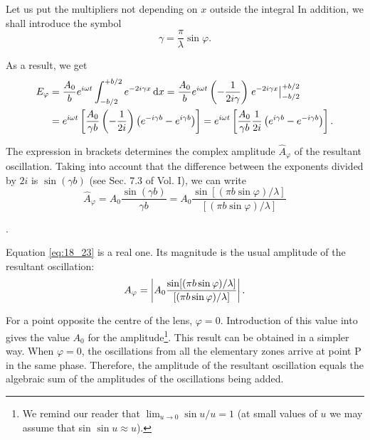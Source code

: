 \noindent
Let us put the multipliers not depending on $x$ outside the integral In addition, we shall introduce the symbol
\begin{equation}\label{eq:18_22}
	\gamma = \frac{\pi}{\lambda} \sin\varphi.
\end{equation}

\noindent
As a result, we get
\begin{align*}
	E_{\varphi} &= \frac{A_0}{b} e^{i\omega t} \int^{+b/2}_{-b/2} e^{-2i\gamma x}\, \mathrm{d} x = \frac{A_0}{b} e^{i\omega t} \left( -\frac{1}{2i\gamma} \right) \left. e^{-2i\gamma x} \right|^{+b/2}_{-b/2}\\
	&= e^{i\omega t} \left[ \frac{A_0}{\gamma b} \left( -\frac{1}{2i} \right) \left( e^{-i\gamma b} - e^{i\gamma b} \right) \right] = e^{i\omega t} \left[ \frac{A_0}{\gamma b} \frac{1}{2i} \left( e^{i\gamma b} - e^{-i\gamma b} \right) \right].
\end{align*}

The expression in brackets determines the complex amplitude $\hat{A}_{\varphi}$ of the resultant oscillation.
Taking into account that the difference between the exponents divided by $2i$ is $\sin(\gamma b)$ (see Sec. 7.3 of Vol. I), we can write
\begin{equation}\label{eq:18_23}
	\hat{A}_{\varphi} = A_0 \frac{\sin(\gamma b)}{\gamma b} = A_0 \frac{\sin[(\pi b \sin\varphi)/\lambda]}{[(\pi b \sin\varphi)/\lambda]}
\end{equation}

.

Equation \eqref{eq:18_23} is a real one.
Its magnitude is the usual amplitude of the resultant oscillation:
\begin{equation}\label{eq:18_24}
	A_{\varphi} = \left|  A_0 \frac{\sin[(\pi b \sin\varphi)/\lambda]}{[(\pi b \sin\varphi)/\lambda]}  \right|.
\end{equation}

For a point opposite the centre of the lens, $\varphi=0$.
Introduction of this value into  gives the value $A_0$ for the amplitude\footnote{We remind our reader that $\lim_{u\to 0}\sin u/u = 1$ (at small values of $u$ we may assume that sin $\sin u \approx u$).}.
This result can be obtained in a simpler way. When $\varphi=0$, the oscillations from all the elementary zones arrive at point P in the same phase.
Therefore, the amplitude of the resultant oscillation equals the algebraic sum of the amplitudes of the oscillations being added.

